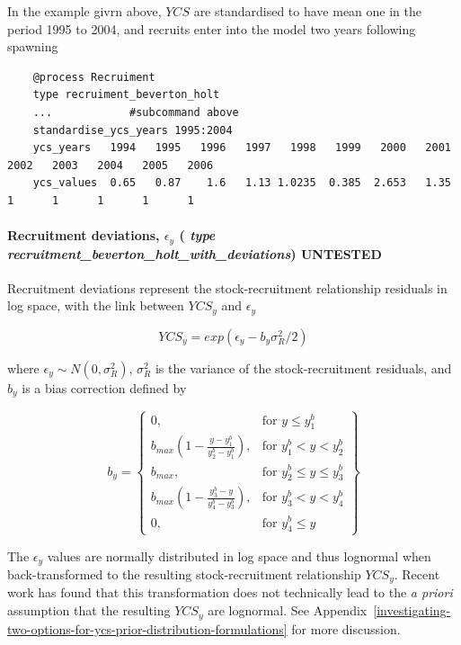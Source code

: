 In the  example givrn above,  $YCS$ are standardised to have mean one in the period 1995 to 2004, and recruits enter into the model two years following spawning

{\small{\begin{verbatim}
	@process Recruiment
	type recruiment_beverton_holt
	...            #subcommand above
	standardise_ycs_years 1995:2004
	ycs_years   1994   1995   1996   1997   1998   1999   2000   2001   2002   2003   2004   2005   2006
	ycs_values  0.65   0.87    1.6   1.13 1.0235  0.385  2.653   1.35      1      1      1      1      1
\end{verbatim}}}


\paragraph*{Recruitment deviations, $\epsilon_y$ ( \textit{type recruitment\_beverton\_holt\_with\_deviations}) UNTESTED}

Recruitment deviations represent the stock-recruitment relationship residuals in log space, with the link between $YCS_y$ and $\epsilon_y$

\begin{equation}\label{eq:recruit_devs}
	YCS_y = exp(\epsilon_y - b_y\sigma^2_R / 2)
\end{equation}

where $\epsilon_y\sim N(0,\sigma^2_R)$, $\sigma^2_R$ is the variance of the stock-recruitment residuals, and $b_y$ is a bias correction defined by \cite{methot2011adjusting}

\begin{equation}\label{eq::bias}
b_y = \left\{\begin{array}{lr}
0, & \text{for }y\leq y_1^b\\
b_{max}(1 - \frac{y - y_1^b}{y_2^b - y_1^b}), & \text{for } y_1^b < y < y_2^b\\
b_{max}, & \text{for } y_2^b\leq y \leq y_3^b\\
b_{max}(1 - \frac{y_3^b - y}{y_4^b - y_3^b}), & \text{for }  y_3^b< y < y_4^b\\
0, & \text{for } y_4^b\leq y
\end{array}\right\}
\end{equation}

The $\epsilon_y$ values are normally distributed in log space and thus lognormal when back-transformed to the resulting stock-recruitment relationship $YCS_y$. Recent work has found that this transformation does not technically lead to the \textit{a priori} assumption that the resulting $YCS_y$ are lognormal. See Appendix~\ref{investigating-two-options-for-ycs-prior-distribution-formulations} for more discussion.

